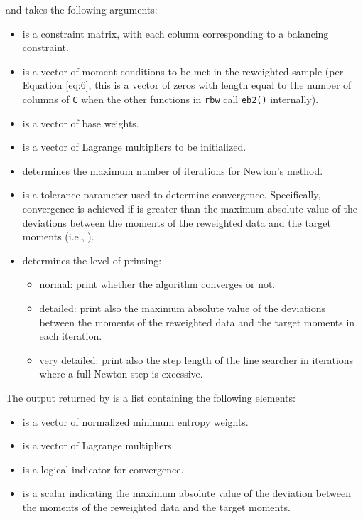 and takes the following arguments:

\begin{itemize}
\tightlist
\item
   is a constraint matrix, with each column corresponding to a
  balancing constraint.
\item
   is a vector of moment conditions to be met in the reweighted
  sample (per Equation \ref{eq:6}, this is a vector of zeros with length
  equal to the number of columns of \texttt{C} when the other functions
  in \texttt{rbw} call \texttt{eb2()} internally).
\item
   is a vector of base weights.
\item
   is a vector of Lagrange multipliers to be initialized.
\item
   determines the maximum number of iterations for
  Newton's method.
\item
   is a tolerance parameter used to determine convergence.
  Specifically, convergence is achieved if  is greater than
  the maximum absolute value of the deviations between the moments of
  the reweighted data and the target moments (i.e., ).
\item
   determines the level of printing:

  \begin{itemize}
  \tightlist
  \item
     normal: print whether the algorithm converges or not.
  \item
     detailed: print also the maximum absolute value of the
    deviations between the moments of the reweighted data and the target
    moments in each iteration.
  \item
     very detailed: print also the step length of the line
    searcher in iterations where a full Newton step is excessive.
  \end{itemize}
\end{itemize}

The output returned by  is a list containing the following
elements:

\begin{itemize}
\tightlist
\item
   is a vector of normalized minimum entropy weights.
\item
   is a vector of Lagrange multipliers.
\item
   is a logical indicator for convergence.
\item
   is a scalar indicating the maximum absolute value of
  the deviation between the moments of the reweighted data and the
  target moments.
\end{itemize}

